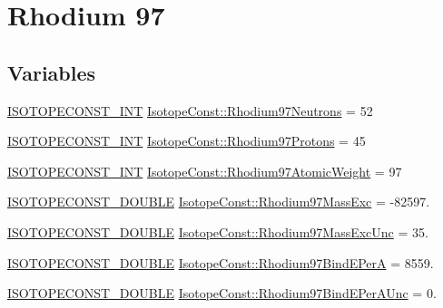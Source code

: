 \hypertarget{group___isotope_const-_rhodium-_rh97}{}\section{Rhodium 97}
\label{group___isotope_const-_rhodium-_rh97}
\subsection*{Variables}
\begin{DoxyCompactItemize}
\item 
\mbox{\hyperlink{group___isotope_const-_macros_ga5f18360b3e99483a35c32d789e62621c}{I\+S\+O\+T\+O\+P\+E\+C\+O\+N\+S\+T\+\_\+\+I\+NT}} \mbox{\hyperlink{group___isotope_const-_rhodium-_rh97_ga537a38492d819ebee9b1197b847e6e70}{Isotope\+Const\+::\+Rhodium97\+Neutrons}} = 52
\item 
\mbox{\hyperlink{group___isotope_const-_macros_ga5f18360b3e99483a35c32d789e62621c}{I\+S\+O\+T\+O\+P\+E\+C\+O\+N\+S\+T\+\_\+\+I\+NT}} \mbox{\hyperlink{group___isotope_const-_rhodium-_rh97_ga26f6d0c2970ce99ac565fc2e1a1197f8}{Isotope\+Const\+::\+Rhodium97\+Protons}} = 45
\item 
\mbox{\hyperlink{group___isotope_const-_macros_ga5f18360b3e99483a35c32d789e62621c}{I\+S\+O\+T\+O\+P\+E\+C\+O\+N\+S\+T\+\_\+\+I\+NT}} \mbox{\hyperlink{group___isotope_const-_rhodium-_rh97_ga7c482a76b55ca0817d141ba4859227bb}{Isotope\+Const\+::\+Rhodium97\+Atomic\+Weight}} = 97
\item 
\mbox{\hyperlink{group___isotope_const-_macros_ga8f45a7272ce02c0b4c65c44636ed719a}{I\+S\+O\+T\+O\+P\+E\+C\+O\+N\+S\+T\+\_\+\+D\+O\+U\+B\+LE}} \mbox{\hyperlink{group___isotope_const-_rhodium-_rh97_gabbe376077072d3a7a137f182d171c79d}{Isotope\+Const\+::\+Rhodium97\+Mass\+Exc}} = -\/82597.
\item 
\mbox{\hyperlink{group___isotope_const-_macros_ga8f45a7272ce02c0b4c65c44636ed719a}{I\+S\+O\+T\+O\+P\+E\+C\+O\+N\+S\+T\+\_\+\+D\+O\+U\+B\+LE}} \mbox{\hyperlink{group___isotope_const-_rhodium-_rh97_ga0791beb138415fcafb57c4cf0e31f212}{Isotope\+Const\+::\+Rhodium97\+Mass\+Exc\+Unc}} = 35.
\item 
\mbox{\hyperlink{group___isotope_const-_macros_ga8f45a7272ce02c0b4c65c44636ed719a}{I\+S\+O\+T\+O\+P\+E\+C\+O\+N\+S\+T\+\_\+\+D\+O\+U\+B\+LE}} \mbox{\hyperlink{group___isotope_const-_rhodium-_rh97_gae394c099219b3334504863e5f8a26e6c}{Isotope\+Const\+::\+Rhodium97\+Bind\+E\+PerA}} = 8559.
\item 
\mbox{\hyperlink{group___isotope_const-_macros_ga8f45a7272ce02c0b4c65c44636ed719a}{I\+S\+O\+T\+O\+P\+E\+C\+O\+N\+S\+T\+\_\+\+D\+O\+U\+B\+LE}} \mbox{\hyperlink{group___isotope_const-_rhodium-_rh97_ga288981e5230b80c2564c108b1f45a687}{Isotope\+Const\+::\+Rhodium97\+Bind\+E\+Per\+A\+Unc}} = 0.

\end{DoxyCompactItemize}
